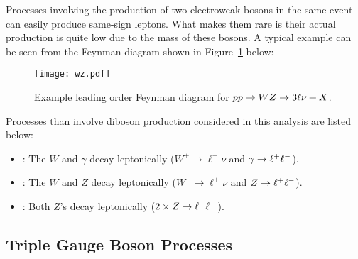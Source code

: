 Processes involving the production of two electroweak bosons in the same event
can easily produce same-sign leptons. What makes them rare is their actual
production is quite low due to the mass of these bosons. A typical
example can be seen from the Feynman diagram shown in Figure~\ref{fig:feyn_wz}
below:
\begin{figure}[!htb]
\begin{center}
\texttt{[image: wz.pdf]}
\caption[Feynman diagram for \WZ]
{\label{fig:feyn_wz}
Example leading order Feynman diagram for $pp \to \relax{WZ} \to 3\ell\nu + X$.
}
\end{center}
\end{figure}
Processes than involve diboson production considered in this analysis are
listed below:
\begin{itemize}
\item \Wgamma: The $W$ and $\gamma$ decay leptonically ($W^{\pm} \to \ell^{\pm}\nu$ and $\gamma\to\ell^+\ell^-$).
\item \WZ: The $W$ and $Z$ decay leptonically ($W^{\pm} \to \ell^{\pm}\nu$ and $\relax{Z}\to\ell^+\ell^-$).
\item \ZZ: Both $Z$'s decay leptonically ($2 \times \relax{Z}\to\ell^+\ell^-$).
\end{itemize}
 
\subsection{Triple Gauge Boson Processes}
\label{sec:ss_rare_triboson}

